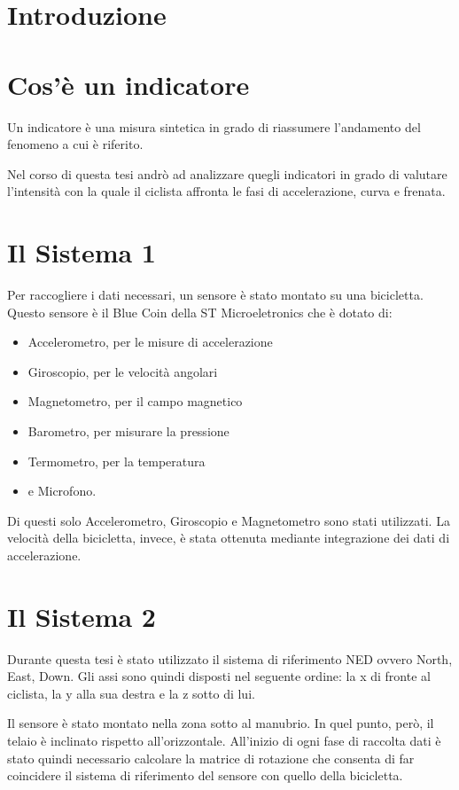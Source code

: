 \documentclass[12pt,a4paper]{article}
\begin{document}
	\section{Introduzione}
	\section{Cos'è un indicatore}
	Un indicatore è una misura sintetica in grado di riassumere l'andamento del fenomeno a cui è riferito.
	
	Nel corso di questa tesi andrò ad analizzare quegli indicatori in grado di valutare l'intensità con la quale il ciclista affronta le fasi di accelerazione, curva e frenata.
	
	\section{Il Sistema 1}
	Per raccogliere i dati necessari, un sensore è stato montato su una bicicletta. Questo sensore è il Blue Coin della ST Microeletronics che è dotato di:
	\begin{itemize}
		\item Accelerometro, per le misure di accelerazione
		\item Giroscopio, per le velocità angolari
		\item Magnetometro, per il campo magnetico
		\item Barometro, per misurare la pressione
		\item Termometro, per la temperatura
		\item e Microfono.
	\end{itemize}
	
	Di questi solo Accelerometro, Giroscopio e Magnetometro sono stati utilizzati.
	La velocità della bicicletta, invece, è stata ottenuta mediante integrazione dei dati di accelerazione.
	
	\section{Il Sistema 2}
	Durante questa tesi è stato utilizzato il sistema di riferimento NED ovvero North, East, Down. Gli assi sono quindi disposti nel seguente ordine: la x di fronte al ciclista, la y alla sua destra e la z sotto di lui.
	
	Il sensore è stato montato nella zona sotto al manubrio. In quel punto, però, il telaio è inclinato rispetto all'orizzontale. All'inizio di ogni fase di raccolta dati è stato quindi necessario calcolare la matrice di rotazione che consenta di far coincidere il sistema di riferimento del sensore con quello della bicicletta.
	
\end{document}
